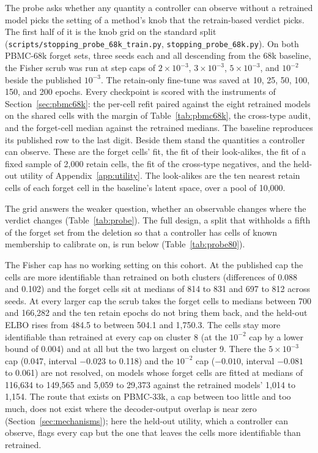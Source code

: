\documentclass{article}
\begin{document}
The probe asks whether any quantity a controller can observe without a retrained model picks the setting of a method's knob that the retrain-based verdict picks. The first half of it is the knob grid on the standard split (\texttt{scripts/stopping\_probe\_68k\_train.py}, \texttt{stopping\_probe\_68k.py}). On both PBMC-68k forget sets, three seeds each and all descending from the 68k baseline, the Fisher scrub was run at step caps of $2\times 10^{-3}$, $3\times 10^{-3}$, $5\times 10^{-3}$, and $10^{-2}$ beside the published $10^{-3}$. The retain-only fine-tune was saved at 10, 25, 50, 100, 150, and 200 epochs. Every checkpoint is scored with the instruments of Section~\ref{sec:pbmc68k}: the per-cell refit paired against the eight retrained models on the shared cells with the margin of Table~\ref{tab:pbmc68k}, the cross-type audit, and the forget-cell median against the retrained medians. The baseline reproduces its published row to the last digit. Beside them stand the quantities a controller can observe. These are the forget cells' fit, the fit of their look-alikes, the fit of a fixed sample of 2,000 retain cells, the fit of the cross-type negatives, and the held-out utility of Appendix~\ref{app:utility}. The look-alikes are the ten nearest retain cells of each forget cell in the baseline's latent space, over a pool of 10,000.

The grid answers the weaker question, whether an observable changes where the verdict changes (Table~\ref{tab:probe}). The full design, a split that withholds a fifth of the forget set from the deletion so that a controller has cells of known membership to calibrate on, is run below (Table~\ref{tab:probe80}).

The Fisher cap has no working setting on this cohort. At the published cap the cells are more identifiable than retrained on both clusters (differences of 0.088 and 0.102) and the forget cells sit at medians of 814 to 831 and 697 to 812 across seeds. At every larger cap the scrub takes the forget cells to medians between 700 and 166,282 and the ten retain epochs do not bring them back, and the held-out ELBO rises from 484.5 to between 504.1 and 1,750.3. The cells stay more identifiable than retrained at every cap on cluster 8 (at the $10^{-2}$ cap by a lower bound of 0.004) and at all but the two largest on cluster 9. There the $5\times 10^{-3}$ cap (0.047, interval $-0.023$ to 0.118) and the $10^{-2}$ cap ($-0.010$, interval $-0.081$ to 0.061) are not resolved, on models whose forget cells are fitted at medians of 116,634 to 149,565 and 5,059 to 29,373 against the retrained models' 1,014 to 1,154. The route that exists on PBMC-33k, a cap between too little and too much, does not exist where the decoder-output overlap is near zero (Section~\ref{sec:mechanisms}); here the held-out utility, which a controller can observe, flags every cap but the one that leaves the cells more identifiable than retrained.
\end{document}
